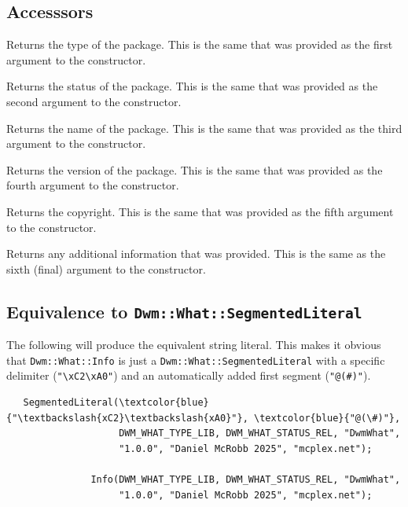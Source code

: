 \begin{minipage}{\linewidth}
\subsection{Accesssors}
\begin{description}[noitemsep,align=left,leftmargin=*,labelsep=10pt,itemindent=-\leftmargin,style=nextline]
\item[\texttt{type()}] Returns the type of the package.  This is the same that was
  provided as the first argument to the constructor.
\item[\texttt{status()}] Returns the status of the package.  This is the same that was
  provided as the second argument to the constructor.
\item[\texttt{name()}] Returns the name of the package.  This is the same that was
  provided as the third argument to the constructor.
\item[\texttt{version()}] Returns the version of the package.  This is the same that
  was provided as the fourth argument to the constructor.
\item[\texttt{copyright()}] Returns the copyright.  This is the same that was provided
  as the fifth argument to the constructor.
\item[\texttt{other()}] Returns any additional information that was provided.  This
  is the same as the sixth (final) argument to the constructor.
\end{description}
\end{minipage}

\subsection{Equivalence to \texttt{Dwm::What::SegmentedLiteral}}
\begin{minipage}{\linewidth}
The following will produce the equivalent string literal.  This makes
it obvious that \texttt{Dwm::What::Info} is just a
\texttt{Dwm::What::SegmentedLiteral} with a specific delimiter
(\texttt{"\textbackslash{xC2}\textbackslash{xA0}"}) and an
automatically added first segment (\texttt{"@(\#)"}).

\begin{Verbatim}
   SegmentedLiteral(\textcolor{blue}{"\textbackslash{xC2}\textbackslash{xA0}"}, \textcolor{blue}{"@(\#)"},
                    DWM_WHAT_TYPE_LIB, DWM_WHAT_STATUS_REL, "DwmWhat",
                    "1.0.0", "Daniel McRobb 2025", "mcplex.net");

               Info(DWM_WHAT_TYPE_LIB, DWM_WHAT_STATUS_REL, "DwmWhat",
                    "1.0.0", "Daniel McRobb 2025", "mcplex.net");
\end{Verbatim}
\end{minipage}

